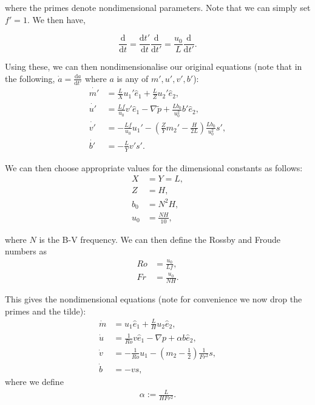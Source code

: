 \documentclass[11pt, oneside]{article}   	%
\newcommand{\eone}{\hat{e}_1}
\newcommand{\etwo}{\hat{e}_2}
\begin{document}
where the primes denote nondimensional parameters. Note that we can simply set \(f' = 1\). We then have, 

\begin{equation}
\frac{\mathrm d}{\mathrm d t} = \frac{\mathrm d t'}{\mathrm d t} \frac{\mathrm d}{\mathrm d t'} = \frac{u_0}{L} \frac{\mathrm d}{\mathrm d t'}.
\end{equation}

Using these, we can then nondimensionalise our original equations (note that in the following, \(\dot{a} = \frac{\mathrm d a}{\mathrm d t'}\) where \(a\) is any of \(m', u', v', b'\)):
\begin{align} 
\dot{m'} &= \frac{L}{X} u_1' \eone +  \frac{L}{Z} u_2' \etwo, \\
\dot{u'} &= \frac{L f}{u_0} v' \eone - \nabla \tilde{p} + \frac{L b_0}{u_0^2} b' \etwo, \\
\dot{v'} &= -\frac{L f}{u_0} u_1' - (\frac{Z}{Y} m_2' - \frac{H}{2L}) \frac{L b_0}{u_0^2} s', \\
\dot{b'} &= -\frac{L}{Y} v' s'.
\end{align}

We can then choose appropriate values for the dimensional constants as follows:
\begin{align} 
X &= Y = L, \\
Z &= H, \\
b_0 &= N^2 H, \\
u_0 &= \frac{N H}{10},
\end{align}

where \(N\) is the B-V frequency. We can then define the Rossby and Froude numbers as
\begin{align} 
Ro &= \frac{u_0}{L f}, \\
Fr &= \frac{u_0}{N H}.
\end{align}

This gives the nondimensional equations (note for convenience we now drop the primes and the tilde):
\begin{align} 
\dot{m} &= u_1 \eone +  \frac{L}{H} u_2 \etwo, \\
\dot{u} &= \frac{1}{Ro} v \eone - \nabla p + \alpha b \etwo, \\
\dot{v} &= -\frac{1}{Ro} u_1 - (m_2 - \frac{1}{2}) \frac{1}{Fr^2} s, \\
\dot{b} &= -v s,
\end{align}
where we define
\begin{align}
\alpha := \frac{L}{H Fr^2}.
\end{align}
\end{document}
